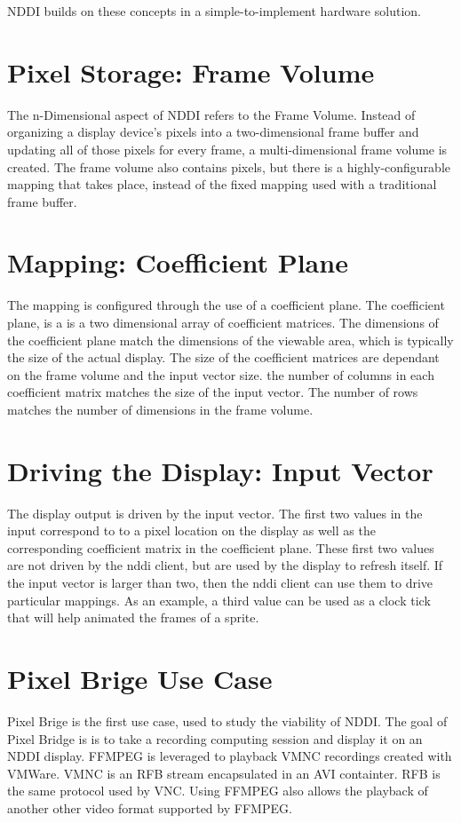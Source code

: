 NDDI builds on these concepts in a simple-\/to-\/implement hardware solution.\hypertarget{index_frameVolume}{}\section{Pixel Storage: Frame Volume}\label{index_frameVolume}
The n-\/Dimensional aspect of NDDI refers to the Frame Volume. Instead of organizing a display device's pixels into a two-\/dimensional frame buffer and updating all of those pixels for every frame, a multi-\/dimensional frame volume is created. The frame volume also contains pixels, but there is a highly-\/configurable mapping that takes place, instead of the fixed mapping used with a traditional frame buffer.\hypertarget{index_coefficientPlane}{}\section{Mapping: Coefficient Plane}\label{index_coefficientPlane}
The mapping is configured through the use of a coefficient plane. The coefficient plane, is a is a two dimensional array of coefficient matrices. The dimensions of the coefficient plane match the dimensions of the viewable area, which is typically the size of the actual display. The size of the coefficient matrices are dependant on the frame volume and the input vector size. the number of columns in each coefficient matrix matches the size of the input vector. The number of rows matches the number of dimensions in the frame volume.\hypertarget{index_inputVector}{}\section{Driving the Display: Input Vector}\label{index_inputVector}
The display output is driven by the input vector. The first two values in the input correspond to to a pixel location on the display as well as the corresponding coefficient matrix in the coefficient plane. These first two values are not driven by the nddi client, but are used by the display to refresh itself. If the input vector is larger than two, then the nddi client can use them to drive particular mappings. As an example, a third value can be used as a clock tick that will help animated the frames of a sprite.\hypertarget{index_pixelBridge}{}\section{Pixel Brige Use Case}\label{index_pixelBridge}
Pixel Brige is the first use case, used to study the viability of NDDI. The goal of Pixel Bridge is is to take a recording computing session and display it on an NDDI display. FFMPEG is leveraged to playback VMNC recordings created with VMWare. VMNC is an RFB stream encapsulated in an AVI containter. RFB is the same protocol used by VNC. Using FFMPEG also allows the playback of another other video format supported by FFMPEG.

